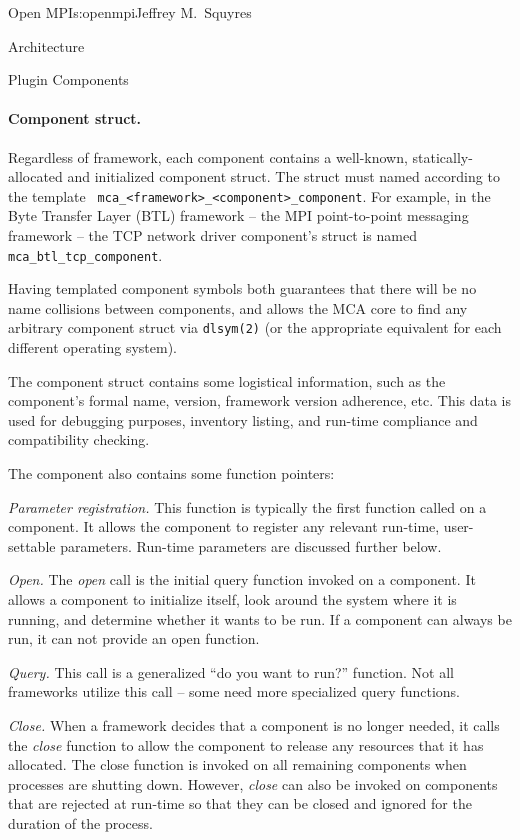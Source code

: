 \begin{aosachapter}{Open MPI}{s:openmpi}{Jeffrey M.\ Squyres}
\begin{aosasect1}{Architecture}
\begin{aosasect2}{Plugin Components}
\paragraph{Component struct.} 

Regardless of framework, each component contains a well-known,
statically-allocated and initialized component struct.  
%
The struct must named according to the template {\tt
  mca\_\-<framework>\_\-<component>\_\-component}.  For example, in
the Byte Transfer Layer (BTL) framework -- the MPI point-to-point
messaging framework -- the TCP network driver component's struct is
named {\tt mca\_\-btl\_\-tcp\_\-component}.

Having templated component symbols both guarantees that there will be
no name collisions between components, and allows the MCA core to find
any arbitrary component struct via {\tt dlsym(2)} (or the appropriate
equivalent for each different operating system).

The component struct contains some logistical information, such as the
component's formal name, version, framework version adherence, etc.
%
This data is used for debugging purposes, inventory listing, and
run-time compliance and compatibility checking.

The component also contains some function pointers:

\begin{aosaitemize}
\item {\em Parameter registration.} This function is typically the
  first function called on a component.  It allows the component to
  register any relevant run-time, user-settable parameters.  Run-time
  parameters are discussed further below.

\item {\em Open.} The {\em open} call is the initial query function
  invoked on a component.  It allows a component to initialize itself,
  look around the system where it is running, and determine whether it
  wants to be run.  If a component can always be run, it can not
  provide an open function.

\item {\em Query.} This call is a generalized ``do you want to run?''
  function.  Not all frameworks utilize this call -- some need more
  specialized query functions.

\item {\em Close.} When a framework decides that a component is no
  longer needed, it calls the {\em close} function to allow the
  component to release any resources that it has allocated.  The close
  function is invoked on all remaining components when processes are
  shutting down.  However, {\em close} can also be invoked on
  components that are rejected at run-time so that they can be closed
  and ignored for the duration of the process.
\end{aosaitemize}


\end{aosasect2}
\end{aosasect1}
\end{aosachapter}
